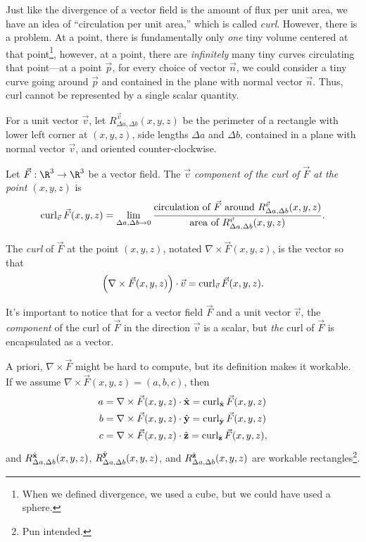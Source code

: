 Just like the divergence of a vector field is the amount of flux per unit area,
we have an idea of ``circulation per unit area,'' which is called \emph{curl}.
However, there is a problem.
At a point, there is fundamentally only \emph{one} tiny volume centered at that
point\footnote{ When we defined divergence, we used a cube, but we could have used
a sphere.}, however, at a point, there are \emph{infinitely} many tiny curves 
circulating that point---at a point $\vec p$,
for every choice of vector $\vec n$, we could consider a tiny curve going around 
$\vec p$ and contained in the plane with normal vector $\vec n$.  
Thus, curl cannot be represented by a single scalar quantity.


\begin{definition}[Curl]
	For a unit vector $\vec v$, 
	let $R^{\vec v}_{\Delta a,\Delta b}(x,y,z)$ be the perimeter
	of a rectangle with lower left
	corner at $(x,y,z)$, side lengths $\Delta a$ and $\Delta b$, contained
	in a plane with normal vector $\vec v$, and oriented counter-clockwise.

	Let $\vec F:\R^3\to\R^3$ be a vector field.  The \emph{$\vec v$
	component of the curl of $\vec F$ at the point $(x,y,z)$} is
	\[
		\operatorname{curl}_{\vec v}\vec F(x,y,z) = \lim_{\Delta a,\Delta b\to 0}
		\frac{
			\text{circulation of }\vec F\text{ around }R^{\vec v}_{\Delta a,\Delta b}(x,y,z)
			}{
			\text{area of }R^{\vec v}_{\Delta a,\Delta b}(x,y,z)}.
	\]

	The \emph{curl} of $\vec F$ at the point $(x,y,z)$, notated
	$\nabla \times \vec F(x,y,z)$, is the vector so that
	\[\Big(\nabla \times \vec F(x,y,z)\Big)\cdot \vec v = \operatorname{curl}_{\vec v}\vec F(x,y,z).\]
\end{definition}

It's important to notice that for a vector field $\vec F$
and a unit vector $\vec v$, the \emph{component} of the curl of $\vec F$ in the direction
$\vec v$ is a scalar, but \emph{the} curl  of $\vec F$ is encapsulated as a vector.

A priori, $\nabla \times \vec F$ might be hard to compute, but its definition 
makes it workable.  If we assume $\nabla \times \vec F(x,y,z)=(a,b,c)$, then
\begin{align*}
	a &= \nabla \times \vec F(x,y,z)\cdot {\hat {\mathbf x}} = \operatorname{curl}_{{\hat {\mathbf x}}} \vec F(x,y,z)\\
	b &= \nabla \times \vec F(x,y,z)\cdot {\hat {\mathbf y}} = \operatorname{curl}_{{\hat {\mathbf y}}} \vec F(x,y,z)\\
	c &= \nabla \times \vec F(x,y,z)\cdot {\hat {\mathbf z}} = \operatorname{curl}_{{\hat {\mathbf z}}} \vec F(x,y,z),
\end{align*}
and $R^{{\hat {\mathbf x}}}_{\Delta a,\Delta b}(x,y,z)$, $R^{{\hat {\mathbf y}}}_{\Delta a,\Delta b}(x,y,z)$,
and
$R^{{\hat {\mathbf z}}}_{\Delta a,\Delta b}(x,y,z)$ are workable rectangles\footnote{ Pun intended.}.


